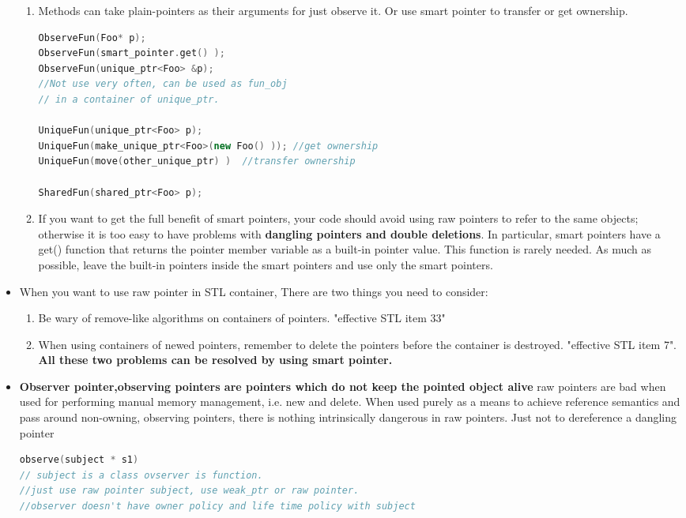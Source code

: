 \documentclass[a4paper,12pt,twoside]{book}
\begin{document}
\begin{itemize}
\begin{enumerate}
\item Methods can take plain-pointers as their arguments for just observe it. Or use smart pointer to transfer or get ownership.
\begin{lstlisting}[frame=single, language=c++]
ObserveFun(Foo* p);
ObserveFun(smart_pointer.get() );
ObserveFun(unique_ptr<Foo> &p);
//Not use very often, can be used as fun_obj
// in a container of unique_ptr.

UniqueFun(unique_ptr<Foo> p);
UniqueFun(make_unique_ptr<Foo>(new Foo() )); //get ownership
UniqueFun(move(other_unique_ptr) )  //transfer ownership

SharedFun(shared_ptr<Foo> p);
\end{lstlisting}

\item If you want to get the full benefit of smart pointers, your code should avoid using raw pointers to refer to the same objects; otherwise it is too easy to have problems with \textbf{dangling pointers and double deletions}. In particular, smart pointers have a get() function that returns the pointer member variable as a built-in pointer value. This function is rarely needed. As much as possible, leave the built-in pointers inside the smart pointers and use only the smart pointers.
\end{enumerate}


\item When you want to use raw pointer in STL container, There are two things you need to consider:
\begin{enumerate}
\item  Be wary of remove-like algorithms on containers of pointers. "effective STL item 33"

\item When using containers of newed pointers, remember to delete the pointers before the container is destroyed. "effective STL item 7". \textbf{All these two problems can be resolved by using smart pointer.}
\end{enumerate}

\item \textbf{Observer pointer,observing pointers are pointers which do not keep the pointed object alive} raw pointers are bad when used for performing manual memory management, i.e. new and delete. When used purely as a means to achieve reference semantics and pass around non-owning, observing pointers, there is nothing intrinsically dangerous in raw pointers. Just not to dereference a dangling pointer
\begin{lstlisting}[frame=single, language=c++]
observe(subject * s1)
// subject is a class ovserver is function.
//just use raw pointer subject, use weak_ptr or raw pointer.
//observer doesn't have owner policy and life time policy with subject
\end{lstlisting}

\end{itemize}
\end{document}
